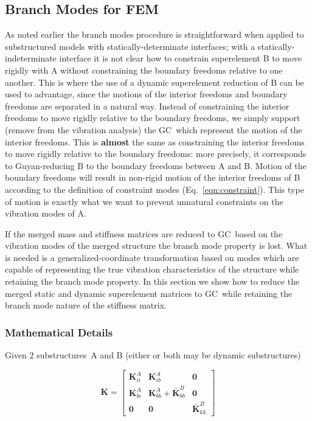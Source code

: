 \documentclass[10pt,openany,twoside]{book}
\numberwithin{equation}{section}   %
\newcommand{\Matrix}[1]{\boldsymbol{#1}}
\newcommand{\Gc}{GC}
\newcommand{\Eqn}[1]{Eq.\ \ref{#1}}
\newcommand{\Sss}{substructures}
\begin{document}
\subsection{Branch Modes for FEM} \label{bm-extended}
As noted earlier
the branch modes procedure is straightforward
when applied to substructured models with statically-determinate
interfaces;
with a statically-indeterminate interface it is
not clear how to constrain superelement B to move rigidly
with A without constraining the boundary freedoms relative to one another.
This is where the use of a dynamic superelement reduction
of B can be used to advantage, since the motions of the
interior freedoms and boundary freedoms are separated
in a natural way.
Instead of constraining the interior freedoms to
move rigidly relative to the boundary freedoms,
we simply support (remove from the vibration analysis)
the \Gc\ which represent the motion
of the interior freedoms.
This is {\bfseries almost\/}
the same as constraining the interior freedoms to
move rigidly relative to the boundary freedoms:
more precisely, it corresponds to Guyan-reducing
B to the boundary freedoms between A and B.
Motion of the boundary freedoms will result in
non-rigid motion of the interior freedoms of B according to
the definition of constraint modes (\Eqn{eqn:constraint}).
This type of motion is exactly what we want to prevent
unnatural constraints on the vibration modes of A.
\par
If the merged mass and stiffness matrices are reduced to
\Gc\ based on the vibration modes of
the merged structure the branch mode property is lost.
What is needed is a generalized-coordinate transformation
based on modes which are capable of representing the true vibration
characteristics of the structure while retaining the branch mode
property.
In this section we show how to reduce the merged static and
dynamic superelement matrices to \Gc\
while retaining the branch mode nature of the stiffness matrix.
\subsubsection{Mathematical Details}
\par
Given 2 \Sss\ A and B (either or both may be dynamic \Sss)

\begin{equation}
\Matrix{K} = \left[
\begin{array}{ccc}
   \Matrix{K}_{ii}^A & \Matrix{K}_{ib}^A & \Matrix{0} \\
   \Matrix{K}_{bi}^A & \Matrix{K}_{bb}^A + \Matrix{\bar{K}}_{bb}^B & \Matrix{0} \\
   \Matrix{0} & \Matrix{0} & \Matrix{\bar{K}}_{kk}^B
\end{array}
\right]				\nonumber
\end{equation}
\end{document}
